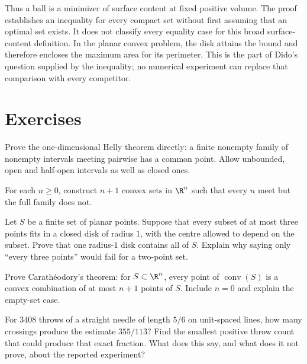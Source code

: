 Thus a ball is a minimizer of surface content at fixed positive volume. The proof establishes an inequality for every compact set without first assuming that an optimal set exists. It does not classify every equality case for this broad surface-content definition. In the planar convex problem, the disk attains the bound and therefore encloses the maximum area for its perimeter. This is the part of Dido's question supplied by the inequality; no numerical experiment can replace that comparison with every competitor.

\section{Exercises}

\begin{exercise}[$\star$]\label{geometry:ex:helly1d}
Prove the one-dimensional Helly theorem directly: a finite nonempty family of nonempty intervals meeting pairwise has a common point. Allow unbounded, open and half-open intervals as well as closed ones.
\end{exercise}

\begin{exercise}[$\star$]\label{geometry:ex:hellysharp}
For each $n\ge0$, construct $n+1$ convex sets in $\R^n$ such that every $n$ meet but the full family does not.
\end{exercise}

\begin{exercise}[$\star\star$]\label{geometry:ex:hellydisk}
Let $S$ be a finite set of planar points. Suppose that every subset of at most three points fits in a closed disk of radius $1$, with the centre allowed to depend on the subset. Prove that one radius-$1$ disk contains all of $S$. Explain why saying only ``every three points'' would fail for a two-point set.
\end{exercise}

\begin{exercise}[$\star\star$]\label{geometry:ex:caratheodory}
Prove Carath\'eodory's theorem: for $S\subset\R^n$, every point of $\operatorname{conv}(S)$ is a convex combination of at most $n+1$ points of $S$. Include $n=0$ and explain the empty-set case.
\end{exercise}

\begin{exercise}[$\star$]\label{geometry:ex:lazzarini}
For $3408$ throws of a straight needle of length $5/6$ on unit-spaced lines, how many crossings produce the estimate $355/113$? Find the smallest positive throw count that could produce that exact fraction. What does this say, and what does it not prove, about the reported experiment?
\end{exercise}

